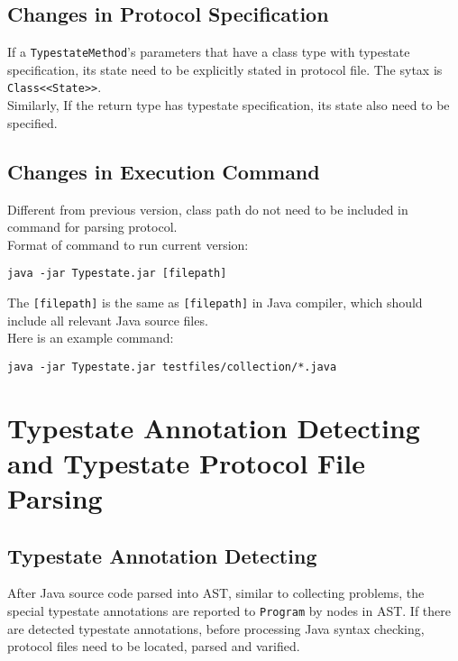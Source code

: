 \documentclass[]{article}
\begin{document}
\subsection{Changes in Protocol Specification}
If a \texttt{TypestateMethod}'s parameters that have a class type with typestate specification, its state need to be explicitly stated in protocol file. The sytax is \texttt{Class<<State>>}. \\[0.2cm]
Similarly, If the return type has typestate specification, its state also need to be specified.

\subsection{Changes in Execution Command}
Different from previous version, class path do not need to be included in command for parsing protocol. \\[0.2cm]
Format of command to run current version:
\begin{verbatim}
java -jar Typestate.jar [filepath]
\end{verbatim}
The \texttt{[filepath]} is the same as \texttt{[filepath]} in Java compiler, which should include all relevant Java source files.\\[0.2cm]
Here is an example command:
\begin{verbatim}
java -jar Typestate.jar testfiles/collection/*.java
\end{verbatim}

\section{Typestate Annotation Detecting and Typestate Protocol File Parsing}
\subsection{Typestate Annotation Detecting}
After Java source code parsed into AST, similar to collecting problems, the special typestate annotations are reported to \texttt{Program} by nodes in AST. If there are detected typestate annotations, before processing Java syntax checking, protocol files need to be located, parsed and varified.
\end{document}
